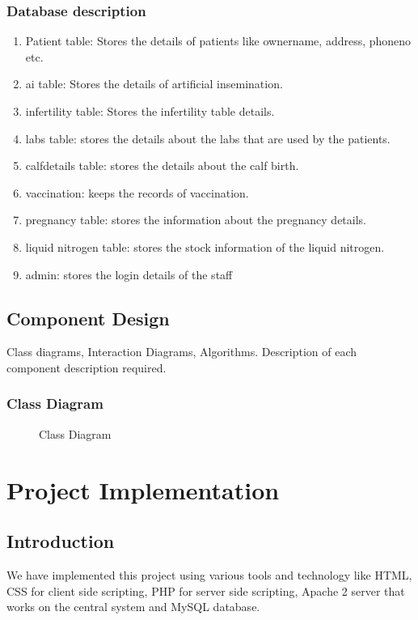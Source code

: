 \documentclass[oneside,a4paper,12pt]{book}
\begin{document}
\subsection{Database description}
\begin{enumerate}[1.]
\item Patient table: Stores the details of patients like ownername, address, phoneno etc.
\item ai table: Stores the details of artificial insemination.
\item infertility table: Stores the infertility table details.
\item labs table: stores the details about the labs that are used by the patients.
\item calfdetails table: stores the details about the calf birth.
\item vaccination: keeps the records of vaccination.
\item pregnancy table: stores the information about the pregnancy details.
\item liquid nitrogen table: stores the stock information of the liquid nitrogen.
\item admin: stores the login details of the staff
\end{enumerate}




\section{Component Design} 
Class diagrams, Interaction Diagrams, Algorithms. Description of each component description required.
\subsection{Class Diagram}
 \begin{center}
	\begin{figure}[!htbp]
		\centering
	  \caption{Class Diagram}
	  \label{fig:class-dig}
	\end{figure}
\end{center} 
 
\chapter{Project Implementation}
  \section{Introduction}
  We have implemented this project using various tools and technology like HTML, CSS for client side scripting, PHP for server side scripting, Apache 2 server that works on the central system and MySQL database.
\end{document}
